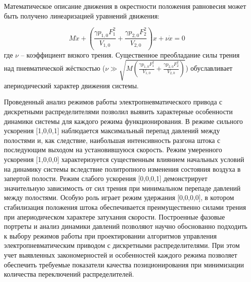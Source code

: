 Математическое описание движения в окрестности положения равновесия может быть получено линеаризацией уравнений движения:

\begin{equation}
	M\ddot{x} + \left(\frac{\gamma p_{1,0}F_1^2}{V_{1,0}} + \frac{\gamma p_{2,0}F_2^2}{V_{2,0}}\right)x + \nu\dot{x} = 0
\end{equation}
где $\nu$ -- коэффициент вязкого трения. Существенное преобладание силы трения над пневматической жёсткостью
($\nu \gg \sqrt{M\left(\frac{\gamma p_{1,0}F_1^2}{V_{1,0}} + \frac{\gamma p_{2,0}F_2^2}{V_{2,0}}\right)}$) обуславливает апериодический характер движения системы.

Проведенный анализ режимов работы электропневматического привода с дискретными распределителями
позволил выявить характерные особенности динамики системы для каждого режима функционирования.
В режиме сильного ускорения [1,0,0,1] наблюдается максимальный перепад давлений между полостями и,
как следствие, наибольшая интенсивность разгона штока с последующим выходом на установившуюся скорость.
Режим умеренного ускорения [1,0,0,0] характеризуется существенным влиянием начальных условий на динамику
системы вследствие политропного изменения состояния воздуха в запертой полости. Режим слабого ускорения
[0,0,0,1] демонстрирует значительную зависимость от сил трения при минимальном перепаде давлений между полостями.
Особую роль играет режим удержания [0,0,0,0], в котором стабилизация положения штока обеспечивается преимущественно
силами трения при апериодическом характере затухания скорости. Построенные фазовые портреты и анализ динамики давлений
позволяют научно обоснованно подходить к выбору режимов работы при проектировании алгоритмов управления электропневматическим
приводом с дискретными распределителями. При этом учет выявленных закономерностей и особенностей каждого режима позволяет
обеспечить требуемые показатели качества позиционирования при минимизации количества переключений распределителей.